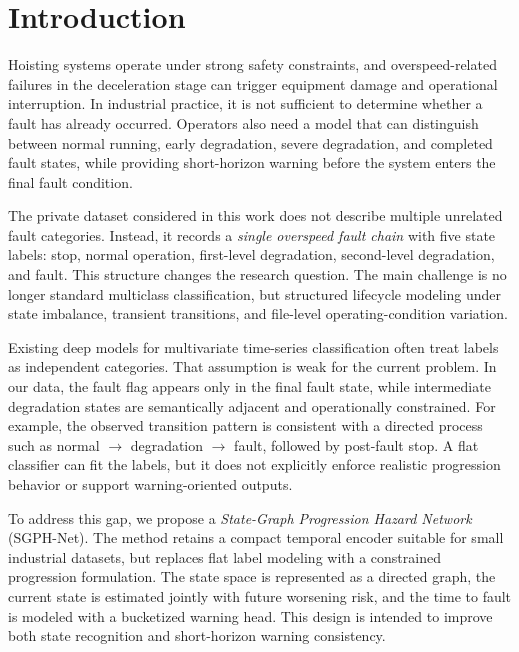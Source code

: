 \section{Introduction}

Hoisting systems operate under strong safety constraints, and overspeed-related failures in the deceleration stage can trigger equipment damage and operational interruption. In industrial practice, it is not sufficient to determine whether a fault has already occurred. Operators also need a model that can distinguish between normal running, early degradation, severe degradation, and completed fault states, while providing short-horizon warning before the system enters the final fault condition.

The private dataset considered in this work does not describe multiple unrelated fault categories. Instead, it records a \emph{single overspeed fault chain} with five state labels: stop, normal operation, first-level degradation, second-level degradation, and fault. This structure changes the research question. The main challenge is no longer standard multiclass classification, but structured lifecycle modeling under state imbalance, transient transitions, and file-level operating-condition variation.

Existing deep models for multivariate time-series classification often treat labels as independent categories. That assumption is weak for the current problem. In our data, the fault flag appears only in the final fault state, while intermediate degradation states are semantically adjacent and operationally constrained. For example, the observed transition pattern is consistent with a directed process such as normal $\rightarrow$ degradation $\rightarrow$ fault, followed by post-fault stop. A flat classifier can fit the labels, but it does not explicitly enforce realistic progression behavior or support warning-oriented outputs.

To address this gap, we propose a \emph{State-Graph Progression Hazard Network} (SGPH-Net). The method retains a compact temporal encoder suitable for small industrial datasets, but replaces flat label modeling with a constrained progression formulation. The state space is represented as a directed graph, the current state is estimated jointly with future worsening risk, and the time to fault is modeled with a bucketized warning head. This design is intended to improve both state recognition and short-horizon warning consistency.


